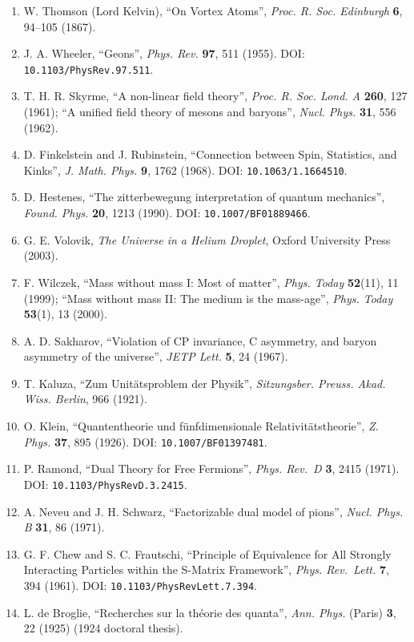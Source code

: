 \documentclass[
  a4paper,
]{article}
\providecommand{\tightlist}{%
  \setlength{\itemsep}{0pt}\setlength{\parskip}{0pt}}
\begin{document}
\begin{enumerate}
\def\labelenumi{\arabic{enumi}.}
\setcounter{enumi}{9}
\tightlist
\item
  W. Thomson (Lord Kelvin), ``On Vortex Atoms'', \emph{Proc. R. Soc.
  Edinburgh} \textbf{6}, 94--105 (1867).
\item
  J. A. Wheeler, ``Geons'', \emph{Phys. Rev.} \textbf{97}, 511 (1955).
  DOI: \texttt{10.1103/PhysRev.97.511}.
\item
  T. H. R. Skyrme, ``A non-linear field theory'', \emph{Proc. R. Soc.
  Lond. A} \textbf{260}, 127 (1961); ``A unified field theory of mesons
  and baryons'', \emph{Nucl. Phys.} \textbf{31}, 556 (1962).
\item
  D. Finkelstein and J. Rubinstein, ``Connection between Spin,
  Statistics, and Kinks'', \emph{J. Math. Phys.} \textbf{9}, 1762
  (1968). DOI: \texttt{10.1063/1.1664510}.
\item
  D. Hestenes, ``The zitterbewegung interpretation of quantum
  mechanics'', \emph{Found. Phys.} \textbf{20}, 1213 (1990). DOI:
  \texttt{10.1007/BF01889466}.
\item
  G. E. Volovik, \emph{The Universe in a Helium Droplet}, Oxford
  University Press (2003).
\item
  F. Wilczek, ``Mass without mass I: Most of matter'', \emph{Phys.
  Today} \textbf{52}(11), 11 (1999); ``Mass without mass II: The medium
  is the mass-age'', \emph{Phys. Today} \textbf{53}(1), 13 (2000).
\item
  A. D. Sakharov, ``Violation of CP invariance, C asymmetry, and baryon
  asymmetry of the universe'', \emph{JETP Lett.} \textbf{5}, 24 (1967).
\item
  T. Kaluza, ``Zum Unitätsproblem der Physik'', \emph{Sitzungsber.
  Preuss. Akad. Wiss. Berlin}, 966 (1921).
\item
  O. Klein, ``Quantentheorie und fünfdimensionale Relativitätstheorie'',
  \emph{Z. Phys.} \textbf{37}, 895 (1926). DOI:
  \texttt{10.1007/BF01397481}.
\item
  P. Ramond, ``Dual Theory for Free Fermions'', \emph{Phys. Rev.~D}
  \textbf{3}, 2415 (1971). DOI: \texttt{10.1103/PhysRevD.3.2415}.
\item
  A. Neveu and J. H. Schwarz, ``Factorizable dual model of pions'',
  \emph{Nucl. Phys. B} \textbf{31}, 86 (1971).
\item
  G. F. Chew and S. C. Frautschi, ``Principle of Equivalence for All
  Strongly Interacting Particles within the S-Matrix Framework'',
  \emph{Phys. Rev.~Lett.} \textbf{7}, 394 (1961). DOI:
  \texttt{10.1103/PhysRevLett.7.394}.
\item
  L. de Broglie, ``Recherches sur la théorie des quanta'', \emph{Ann.
  Phys.} (Paris) \textbf{3}, 22 (1925) (1924 doctoral thesis).
\end{enumerate}
\end{document}
